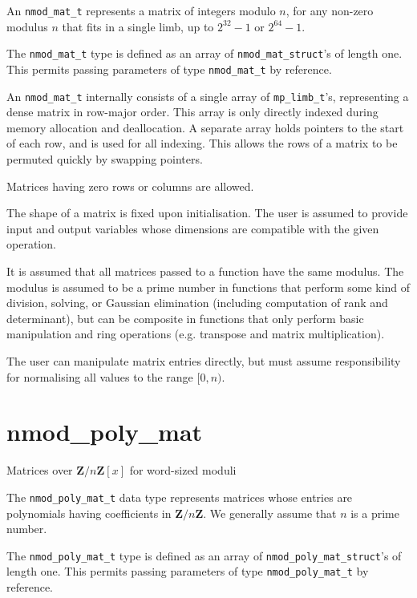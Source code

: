 \documentclass[a4paper,10pt]{book}
\newcommand{\Z}{\mathbf{Z}}%
\newcommand{\code}{\lstinline}
\begin{document}
{{An \code{nmod_mat_t} represents a matrix of integers modulo $n$, for any
non-zero modulus $n$ that fits in a single limb,
up to $2^{32}-1$ or $2^{64}-1$.

The \code{nmod_mat_t} type is defined as an array of
\code{nmod_mat_struct}'s of length one.
This  permits passing parameters of type \code{nmod_mat_t}
by reference.

An \code{nmod_mat_t} internally consists of a single array of
\code{mp_limb_t}'s, representing a dense matrix in row-major order.
This array is only directly indexed during memory allocation and
deallocation. A separate array holds pointers to the start of each
row, and is used for all indexing. This allows the rows of a matrix
to be permuted quickly by swapping pointers.

Matrices having zero rows or columns are allowed.

The shape of a matrix is fixed upon initialisation.
The user is assumed to provide input and output variables
whose dimensions are compatible with the given operation.

It is assumed that all matrices passed to a function have the same modulus.
The modulus is assumed to be a prime number in functions that
perform some kind of division, solving, or Gaussian elimination
(including computation of rank and determinant),
but can be composite in functions that only perform basic manipulation
and ring operations (e.g. transpose and matrix multiplication).

The user can manipulate matrix entries directly, but must
assume responsibility for normalising all values to the range $[0, n)$.




\chapter{nmod\_poly\_mat}
\epigraph{Matrices over $\Z / n \Z[x]$ for word-sized moduli}{}

The \code{nmod_poly_mat_t} data type represents matrices whose
entries are polynomials having coefficients in $\Z / n \Z$.
We generally assume that $n$ is a prime number.

The \code{nmod_poly_mat_t} type is defined as an array of
\code{nmod_poly_mat_struct}'s of length one.
This permits passing parameters of type \code{nmod_poly_mat_t}
by reference.

}}
\end{document}
